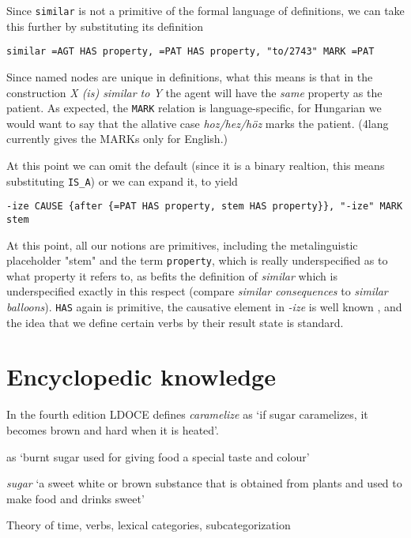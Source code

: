 \documentclass[11pt,bookmarks,bookmarksnumbered,naturalnames,plainpages=false,pdftex,colorlinks=true,urlcolor=blue,bookmarksdepth=subsection,plainpages=false]{paper}
\begin{document}
Since {\tt similar} is not a primitive of the formal language of definitions,
we can take this further by substituting its definition 

\begin{verbatim}
similar =AGT HAS property, =PAT HAS property, "to/2743" MARK =PAT
\end{verbatim}

\noindent
Since named nodes are unique in definitions, what this means is that in the
construction {\it X (is) similar to Y} the agent will have the {\it same}
property as the patient. As expected, the {\tt MARK} relation is
language-specific, for Hungarian we would want to say that the allative case
{\it hoz/hez/h\"{o}z} marks the patient. (4lang currently gives the MARKs only
for English.) 

At this point we can omit the default (since it is a binary realtion, this
means substituting {\tt IS\_A}) or we can expand it, to yield 

\begin{verbatim}
-ize CAUSE {after {=PAT HAS property, stem HAS property}}, "-ize" MARK stem
\end{verbatim}

\noindent At this point, all our notions are primitives, including the
metalinguistic placeholder "stem" and the term {\tt property}, which is really
underspecified as to what property it refers to, as befits the definition of
{\it similar} which is underspecified exactly in this respect (compare {\it
  similar consequences} to {\it similar balloons}). {\tt HAS} again is
primitive, the causative element in {\it -ize} is well known
\citep{Lieber:1992,Plag:1998}, and the idea that we define certain verbs by
their result state is standard. 


\section{Encyclopedic knowledge}

In the fourth edition \citep{Bullen:2003} LDOCE defines {\it caramelize} as
`if sugar caramelizes, it becomes brown and hard when it is heated'. 

\citep{Procter:1978}


as `burnt sugar used for giving food a special
taste and colour' 

{\it sugar} `a sweet white or brown substance that is obtained from plants and
used to make food and drinks sweet' 

Theory of time, verbs, lexical categories, subcategorization
\end{document}
